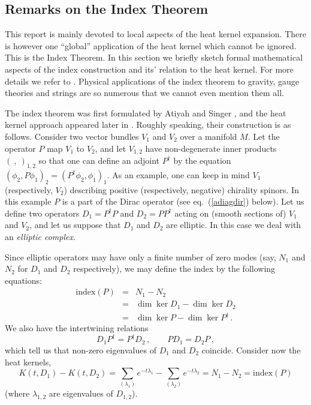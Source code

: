 \subsection{Remarks on the Index Theorem}\label{s7index}
This report is mainly devoted to local aspects of the heat kernel
expansion. There is however one ``global'' 
application of the heat kernel which cannot be ignored. This is the
Index Theorem. In this section we briefly sketch formal
mathematical aspects of the index construction and its' relation
to the heat kernel. For more details we refer to 
\cite{Eguchi:1980jx,Gilkey:1995,Esposito:1997mw,Bertlmann:1996,
Zinn-Justin:2002vj}. Physical applications of the index theorem
to gravity, gauge theories and strings are so numerous that
we cannot even mention them all.

The index theorem was first formulated by Atiyah and Singer
\cite{Atiyah:1963a}, and the heat kernel approach appeared
later in \cite{Gilkey:1973,AtiyahBP:1973}. Roughly speaking,
their construction is as follows.
Consider two vector bundles $V_1$ and $V_2$ over a manifold $M$.
Let the operator $P$ map $V_1$ to $V_2$, and let $V_{1,2}$
have non-degenerate inner products $(\ ,\ )_{1,2}$ so that one
can define an adjoint $P^\dag$ by the equation
$(\phi_2,P\phi_1)_2=(P^\dag \phi_2,\phi_1)_1$. As an example,
one can keep in mind $V_1$ (respectively, $V_2$) describing
positive (respectively, negative) chirality spinors. In this
example $P$ is a part of the Dirac operator (see eq.\ (\ref{adiagdir})
below). Let us define two operators $D_1=P^\dag P$ and
$D_2=PP^\dag$ acting on (smooth sections of) $V_1$ and
$V_2$, and let us suppose that $D_1$ and $D_2$ are elliptic.
In this case we deal with an {\it elliptic complex}.

Since elliptic operators may have only a finite number of zero
modes (say, $N_1$ and $N_2$ for $D_1$ and $D_2$ respectively),
we may define the index by the following equations:
\begin{eqnarray}
{\mbox{index}}(P)&=& N_1 - N_2 \nonumber \\
&=& \dim \ker D_1 - \dim \ker D_2 \nonumber \\
&=& \dim \ker P - \dim \ker P^\dag \,.\label{defind}
\end{eqnarray}
We also have the intertwining relations
\begin{equation}
D_1P^\dag =P^\dag D_2 \,,\qquad PD_1=D_2P \,,\label{intertwin}
\end{equation}
which tell us that non-zero eigenvalues of $D_1$ and $D_2$
coincide. Consider now the heat kernels,
\begin{equation}
K(t,D_1)-K(t,D_2)=\sum_{(\lambda_1)} e^{-t\lambda_1}
-\sum_{(\lambda_2)} e^{-t\lambda_2} =
N_1 - N_2 ={\mbox{index}}(P) \label{hkindex}
\end{equation}
(where $\lambda_{1,2}$ are eigenvalues of $D_{1,2}$).

